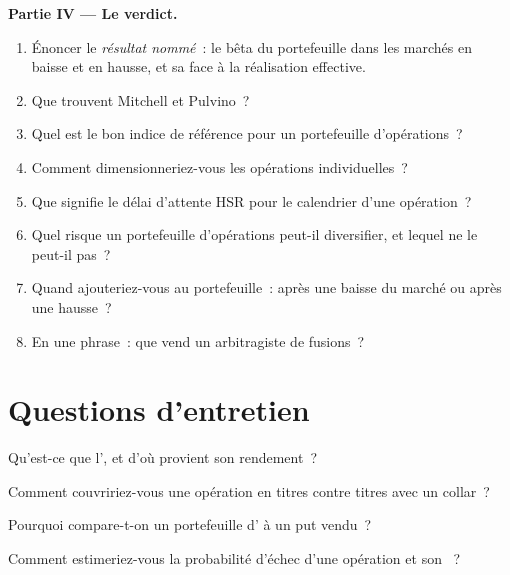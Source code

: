 \begin{problem}
\medskip\noindent\textbf{Partie IV --- Le verdict.}
\begin{enumerate}[resume]
\item Énoncer le \emph{résultat nommé}~: le bêta du portefeuille dans les marchés en baisse et en hausse, et sa  face à la réalisation effective.
\item Que trouvent Mitchell et Pulvino~?
\item Quel est le bon indice de référence pour un portefeuille d'opérations~?
\item Comment dimensionneriez-vous les opérations individuelles~?
\item Que signifie le délai d'attente HSR pour le calendrier d'une opération~?
\item Quel risque un portefeuille d'opérations peut-il diversifier, et lequel ne le peut-il pas~?
\item Quand ajouteriez-vous au portefeuille~: après une baisse du marché ou après une hausse~?
\item En une phrase~: que vend un arbitragiste de fusions~?
\end{enumerate}
\end{problem}

\section{Questions d'entretien}

\begin{interviewq}\label{iq:s1:merger-arbitrage:1}
Qu'est-ce que l', et d'où provient son rendement~?
\end{interviewq}

\begin{interviewq}\label{iq:s1:merger-arbitrage:2}
Comment couvririez-vous une opération en titres contre titres avec un collar~?
\end{interviewq}

\begin{interviewq}\label{iq:s1:merger-arbitrage:3}
Pourquoi compare-t-on un portefeuille d' à un put vendu~?
\end{interviewq}

\begin{interviewq}\label{iq:s1:merger-arbitrage:4}
Comment estimeriez-vous la probabilité d'échec d'une opération et son ~?
\end{interviewq}

